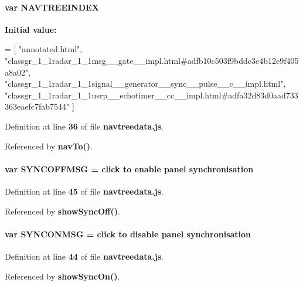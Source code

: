 \paragraph[{N\+A\+V\+T\+R\+E\+E\+I\+N\+D\+EX}]{\setlength{\rightskip}{0pt plus 5cm}var N\+A\+V\+T\+R\+E\+E\+I\+N\+D\+EX}\label{navtreedata_8js_a51b2088f00a4f2f20d495e65be359cd8}
{\bfseries Initial value\+:}
\begin{DoxyCode}
=
[
\textcolor{stringliteral}{"annotated.html"},
\textcolor{stringliteral}{"classgr\_1\_1radar\_1\_1msg\_\_gate\_\_impl.html#adfb10c503f9bddc3e4b12e9f405a8a02"},
\textcolor{stringliteral}{"classgr\_1\_1radar\_1\_1signal\_\_generator\_\_sync\_\_pulse\_\_c\_\_impl.html"},
\textcolor{stringliteral}{"classgr\_1\_1radar\_1\_1usrp\_\_echotimer\_\_cc\_\_impl.html#adfa32d83d0aad733363eaefc7fab7544"}
]
\end{DoxyCode}


Definition at line {\bf 36} of file {\bf navtreedata.\+js}.



Referenced by {\bf nav\+To()}.

\paragraph[{S\+Y\+N\+C\+O\+F\+F\+M\+SG}]{\setlength{\rightskip}{0pt plus 5cm}var S\+Y\+N\+C\+O\+F\+F\+M\+SG = \textquotesingle{}click to {\bf enable} panel synchronisation\textquotesingle{}}\label{navtreedata_8js_a8b93d8f469f8aeb3a0c17b922a2d32ed}


Definition at line {\bf 45} of file {\bf navtreedata.\+js}.



Referenced by {\bf show\+Sync\+Off()}.

\paragraph[{S\+Y\+N\+C\+O\+N\+M\+SG}]{\setlength{\rightskip}{0pt plus 5cm}var S\+Y\+N\+C\+O\+N\+M\+SG = \textquotesingle{}click to disable panel synchronisation\textquotesingle{}}\label{navtreedata_8js_ab31fdb4752a1ada1b708d49d7482f948}


Definition at line {\bf 44} of file {\bf navtreedata.\+js}.



Referenced by {\bf show\+Sync\+On()}.

